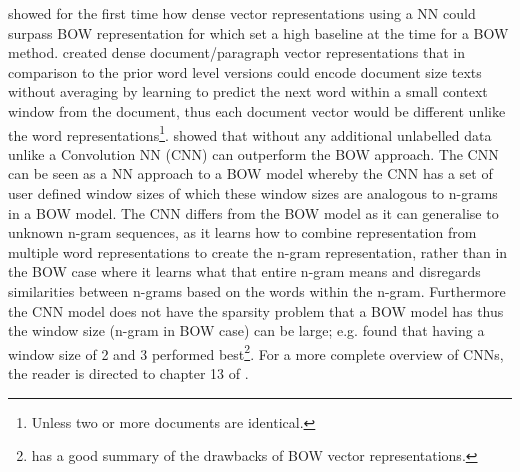\citet{le2014distributed} showed for the first time how dense vector representations using a NN could surpass BOW representation for which \citet{wang-manning-2012-baselines} set a high baseline at the time for a BOW method. \citet{le2014distributed} created dense document/paragraph vector representations that in comparison to the prior word level versions \citep{maas-etal-2011-learning} could encode document size texts without averaging by learning to predict the next word within a small context window from the document, thus each document vector would be different unlike the word representations\footnote{Unless two or more documents are identical.}. \citet{johnson-zhang-2015-effective} showed that without any additional unlabelled data unlike \citet{le2014distributed} a Convolution NN (CNN) can outperform the BOW approach. The CNN can be seen as a NN approach to a BOW model whereby the CNN has a set of user defined window sizes of which these window sizes are analogous to n-grams in a BOW model. The CNN differs from the BOW model as it can generalise to unknown n-gram sequences, as it learns how to combine representation from multiple word representations to create the n-gram representation, rather than in the BOW case where it learns what that entire n-gram means and disregards similarities between n-grams based on the words within the n-gram. Furthermore the CNN model does not have the sparsity problem that a BOW model has thus the window size (n-gram in BOW case) can be large; e.g. \citet{johnson-zhang-2015-effective} found that having a window size of 2 and 3 performed best\footnote{\citet{le2014distributed} has a good summary of the drawbacks of BOW vector representations.}. For a more complete overview of CNNs, the reader is directed to chapter 13 of \citet{goldberg2017neural}.


